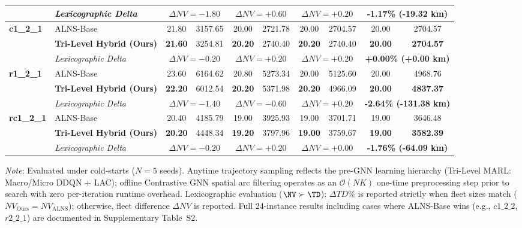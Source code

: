 \begin{table}[!t]
\begin{tabular*}{\textwidth}{@{\extracolsep{\fill}} ll cccccc cc @{}}
 & \textit{Lexicographic Delta} & \multicolumn{2}{c}{$\Delta NV = -1.80$} & \multicolumn{2}{c}{$\Delta NV = +0.60$} & \multicolumn{2}{c}{$\Delta NV = +0.20$} & \multicolumn{2}{c}{\textbf{-1.17\% (-19.32 km)}} \\
\midrule
\multirow{3}{*}{\textbf{c1\_2\_1}} & ALNS-Base & 21.80 & 3157.65 & 20.00 & 2721.78 & 20.00 & 2704.57 & 20.00 & 2704.57 \\
 & \textbf{Tri-Level Hybrid (Ours)} & \textbf{21.60} & 3254.81 & \textbf{20.20} & 2740.40 & \textbf{20.20} & 2740.40 & \textbf{20.00} & \textbf{2704.57} \\
 & \textit{Lexicographic Delta} & \multicolumn{2}{c}{$\Delta NV = -0.20$} & \multicolumn{2}{c}{$\Delta NV = +0.20$} & \multicolumn{2}{c}{$\Delta NV = +0.20$} & \multicolumn{2}{c}{\textbf{+0.00\% (+0.00 km)}} \\
\midrule
\multirow{3}{*}{\textbf{r1\_2\_1}} & ALNS-Base & 23.60 & 6164.62 & 20.80 & 5273.34 & 20.00 & 5125.60 & 20.00 & 4968.76 \\
 & \textbf{Tri-Level Hybrid (Ours)} & \textbf{22.20} & 6012.54 & \textbf{20.20} & 5371.98 & \textbf{20.20} & 4966.09 & \textbf{20.00} & \textbf{4837.37} \\
 & \textit{Lexicographic Delta} & \multicolumn{2}{c}{$\Delta NV = -1.40$} & \multicolumn{2}{c}{$\Delta NV = -0.60$} & \multicolumn{2}{c}{$\Delta NV = +0.20$} & \multicolumn{2}{c}{\textbf{-2.64\% (-131.38 km)}} \\
\midrule
\multirow{3}{*}{\textbf{rc1\_2\_1}} & ALNS-Base & 20.40 & 4185.79 & 19.00 & 3925.93 & 19.00 & 3701.71 & 19.00 & 3646.48 \\
 & \textbf{Tri-Level Hybrid (Ours)} & \textbf{20.20} & 4448.34 & \textbf{19.20} & 3797.96 & \textbf{19.00} & 3759.67 & \textbf{19.00} & \textbf{3582.39} \\
 & \textit{Lexicographic Delta} & \multicolumn{2}{c}{$\Delta NV = -0.20$} & \multicolumn{2}{c}{$\Delta NV = +0.20$} & \multicolumn{2}{c}{$\Delta NV = +0.00$} & \multicolumn{2}{c}{\textbf{-1.76\% (-64.09 km)}} \\
\bottomrule
\end{tabular*}
{\raggedright \scriptsize \textit{Note}: Evaluated under cold-starts ($N=5$ seeds). Anytime trajectory sampling reflects the pre-GNN learning hierarchy (Tri-Level MARL: Macro/Micro DDQN + LAC); offline Contrastive GNN spatial arc filtering operates as an $\mathcal{O}(NK)$ one-time preprocessing step prior to search with zero per-iteration runtime overhead. Lexicographic evaluation ($\NV \succ \TD$): $\Delta TD\%$ is reported strictly when fleet sizes match ($NV_{\text{Ours}} = NV_{\text{ALNS}}$); otherwise, fleet difference $\Delta NV$ is reported. Full 24-instance results including cases where ALNS-Base wins (e.g., $c1\_2\_2$, $r2\_2\_1$) are documented in Supplementary Table~S2.\par}
\end{table}

